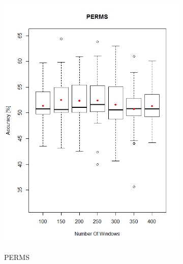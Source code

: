 \begin{figure}[h]
\centering
\begin{subfigure}{.5\textwidth}
  \centering
  \includegraphics[width=\linewidth]{permsNumWindows}
  \label{fig_permsSupportSerial}
  \caption{PERMS}
\end{subfigure}%
\begin{subfigure}{.5\textwidth}
  \centering

\end{subfigure}
\end{figure}
